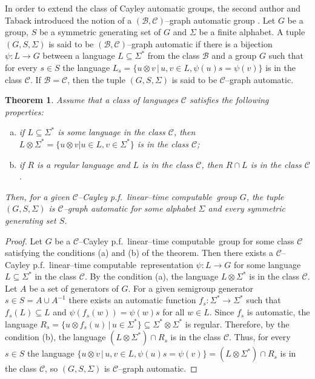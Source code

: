 \documentclass[article,12pt]{elsarticle}
\newtheorem{theorem}{Theorem}
\newcommand\ClinearC{$\mathcal{C}$--Cayley p.f.~linear--time computable}
\begin{document}
 
In order 
to extend the class of Cayley automatic groups, 
the second author and Taback introduced the notion of a 
$\left(\mathcal{B},\mathcal{C}\right)$--graph 
automatic group \cite{ElderTabackCgraph}.  
Let $G$ be a group, $S$ be a symmetric generating set of $G$ and $\Sigma$ be a finite alphabet. 
A tuple $(G,S,\Sigma)$ is said to be 
$(\mathcal{B},\mathcal{C})$--graph 
automatic if there is a bijection 
$\psi : L \rightarrow G$ between a language 
$L \subseteq \Sigma ^*$ from the class 
$\mathcal{B}$ and a group $G$ such that 
for every $s \in S$  the  language 
$L_s = \{u \otimes v \, | \, u,v \in L,
\psi(u)s = \psi(v)\}$ is in the class $\mathcal{C}$. 
If $\mathcal{B}=\mathcal{C}$, then the tuple 
$(G,S,\Sigma)$ is said to be $\mathcal{C}$--graph 
automatic. 
\begin{theorem}
	\label{CquasiCayley_are_Cgraphautomatic}
	Assume that a class of languages 
	$\mathcal{C}$ satisfies the following properties: 
	\begin{enumerate}[(a)] 
		\item{if $L \subseteq \Sigma^*$ is some language in 
			the class $\mathcal{C}$, then 
			$L \otimes \Sigma^*= 
			\{u \otimes v | u \in  L, v \in \Sigma^*\}$ is in the class $\mathcal{C}$;} 
		\item{if $R$ is a regular language and $L$ is in
			the class $\mathcal{C}$, then $R \cap L$ is 
			in the class $\mathcal{C}$.}   
	\end{enumerate}   
	Then, for a given %
	\ClinearC\ group $G$, the tuple $(G,S,\Sigma)$  is	$\mathcal{C}$--graph automatic for some alphabet 
	$\Sigma$ and every symmetric generating set $S$.  
\end{theorem}
\begin{proof} 	  
	Let $G$ be a \ClinearC\ 
	group for some class $\mathcal{C}$ satisfying the 
	conditions (a) and (b) of the theorem. 
	Then there exists a \ClinearC\ representation 
	$\psi : L \rightarrow G$ for some language 
	$L \subseteq \Sigma^*$ in the class $\mathcal{C}$. 
	By the condition (a), the language
	$L \otimes \Sigma^*$ is in the class  
	$\mathcal{C}$. Let $A$ be a set of generators 
	of $G$. For a given semigroup generator 
	$s \in S =  A \cup A^{-1}$ there exists an 
	automatic function 
	$f_s : \Sigma^* \rightarrow \Sigma^*$  
	such that $f_s (L) \subseteq L$ and 
	$\psi (f_s(w)) = \psi(w)s$ for all $w \in L$. 
	Since $f_s$ is automatic, the language  
	$R_s = \{u \otimes f_s (u) \, |\, u \in \Sigma^*  \} 
	\subseteq \Sigma^* \otimes \Sigma^*$ is regular. 
	Therefore, by the condition (b), the language 
	$ (L \otimes \Sigma^*) \cap R_s$ is in the class 
	$\mathcal{C}$. 
	Thus, for every $s \in S$ the  
	language $\{u \otimes v  \, | \, 
	u,v\in L, \psi (u) s = \psi (v) \} = 
	(L \otimes \Sigma^*) \cap R_s$  is 
	in the class $\mathcal{C}$, so 
	$(G,S,\Sigma)$ is $\mathcal{C}$--graph automatic. 
\end{proof}	
\end{document}
